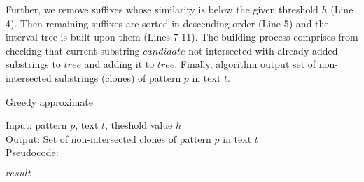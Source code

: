 Further, we remove suffixes whose similarity is below the given threshold $h$ (Line 4).
Then remaining suffixes are sorted in descending order (Line 5) and the interval tree is built upon them (Lines 7-11).
The building process comprises from checking that current substring $candidate$ not intersected with already added substrings to $tree$ and adding it to $tree$.
Finally, algorithm output set of non-intersected substrings (clones) of pattern $p$ in text $t$.


\begin{algorithm}[H]
\caption{Greedy approximate}
\label{alg:appximateMatchingMax}
Input: pattern $p$, text $t$, theshold value $h$\\
Output: Set of non-intersected clones of pattern $p$ in text $t$\\
Pseudocode:
\begin{algorithmic}[1]

\ENDIF
\ENDFOR
{}
\RETURN $result$
\end{algorithmic}
\end{algorithm}


